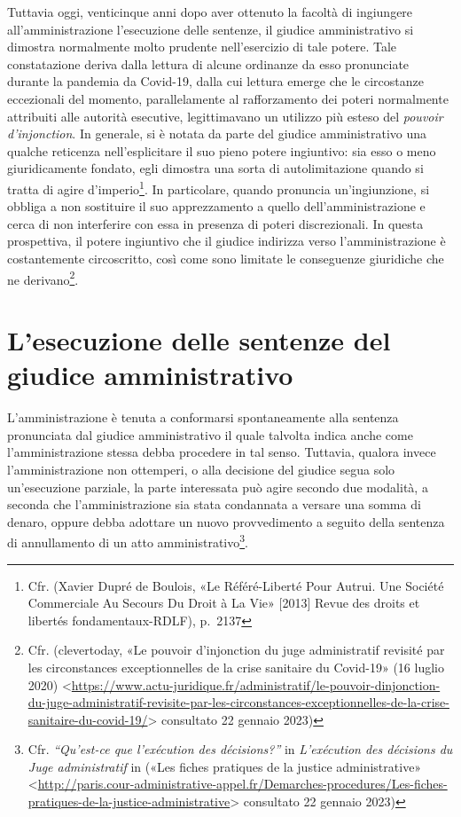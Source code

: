 \documentclass[12pt,it,a4paper,]{report}
\begin{document}
Tuttavia oggi, venticinque anni dopo aver ottenuto la facoltà di
ingiungere all'amministrazione l'esecuzione delle sentenze, il giudice
amministrativo si dimostra normalmente molto prudente nell'esercizio di
tale potere. Tale constatazione deriva dalla lettura di alcune ordinanze
da esso pronunciate durante la pandemia da Covid-19, dalla cui lettura
emerge che le circostanze eccezionali del momento, parallelamente al
rafforzamento dei poteri normalmente attribuiti alle autorità esecutive,
legittimavano un utilizzo più esteso del \emph{pouvoir d'injonction}. In
generale, si è notata da parte del giudice amministrativo una qualche
reticenza nell'esplicitare il suo pieno potere ingiuntivo: sia esso o
meno giuridicamente fondato, egli dimostra una sorta di autolimitazione
quando si tratta di agire d'imperio\footnote{Cfr. (Xavier Dupré de
  Boulois, {«Le Référé-Liberté Pour Autrui. {Une} Société Commerciale Au
  Secours Du Droit à La Vie»} {[}2013{]} Revue des droits et libertés
  fondamentaux-RDLF), p.~2137}. In particolare, quando pronuncia
un'ingiunzione, si obbliga a non sostituire il suo apprezzamento a
quello dell'amministrazione e cerca di non interferire con essa in
presenza di poteri discrezionali. In questa prospettiva, il potere
ingiuntivo che il giudice indirizza verso l'amministrazione è
costantemente circoscritto, così come sono limitate le conseguenze
giuridiche che ne derivano\footnote{Cfr. (clevertoday, {«Le pouvoir
  d'injonction du juge administratif revisité par les circonstances
  exceptionnelles de la crise sanitaire du Covid-19»} (16 luglio 2020)
  \textless{}\url{https://www.actu-juridique.fr/administratif/le-pouvoir-dinjonction-du-juge-administratif-revisite-par-les-circonstances-exceptionnelles-de-la-crise-sanitaire-du-covid-19/}\textgreater{}
  consultato 22 gennaio 2023)}.

\hypertarget{lesecuzione-delle-sentenze-del-giudice-amministrativo}{%
\section{L'esecuzione delle sentenze del giudice
amministrativo}\label{lesecuzione-delle-sentenze-del-giudice-amministrativo}}

L'amministrazione è tenuta a conformarsi spontaneamente alla sentenza
pronunciata dal giudice amministrativo il quale talvolta indica anche
come l'amministrazione stessa debba procedere in tal senso. Tuttavia,
qualora invece l'amministrazione non ottemperi, o alla decisione del
giudice segua solo un'esecuzione parziale, la parte interessata può
agire secondo due modalità, a seconda che l'amministrazione sia stata
condannata a versare una somma di denaro, oppure debba adottare un nuovo
provvedimento a seguito della sentenza di annullamento di un atto
amministrativo\footnote{Cfr. \emph{``Qu'est-ce que l'exécution des
  décisions?''} in \emph{L'exécution des décisions du Juge
  administratif} in ({«Les fiches pratiques de la justice
  administrative»}
  \textless{}\url{http://paris.cour-administrative-appel.fr/Demarches-procedures/Les-fiches-pratiques-de-la-justice-administrative}\textgreater{}
  consultato 22 gennaio 2023)}.
\end{document}
